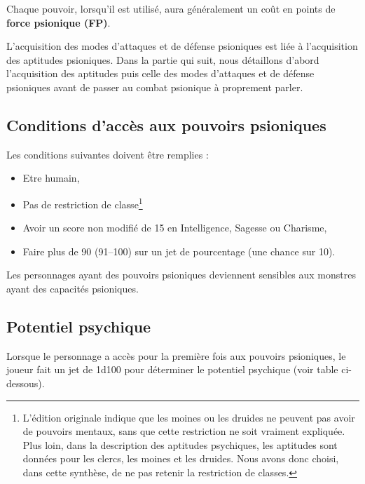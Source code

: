 \documentclass[11pt]{article}
\begin{document}
{\bigskip

Chaque pouvoir, lorsqu'il est utilisé, aura généralement un coût en points de \textbf{force psionique (FP)}.

L'acquisition des modes d'attaques et de défense psioniques est liée à l'acquisition des aptitudes psioniques. Dans la partie qui suit, nous détaillons d'abord l'acquisition des aptitudes puis celle des modes d'attaques et de défense psioniques avant de passer au combat psionique à proprement parler.

\subsection*{Conditions d'accès aux pouvoirs psioniques}

Les conditions suivantes doivent être remplies :

\bigskip

\begin{itemize}
\item Etre humain,
\item Pas de restriction de classe\footnote{L'édition originale indique que les moines ou les druides ne peuvent pas avoir de pouvoirs mentaux, sans que cette restriction ne soit vraiment expliquée. Plus loin, dans la description des aptitudes psychiques, les aptitudes sont données pour les clercs, les moines et les druides. Nous avons donc choisi, dans cette synthèse, de ne pas retenir la restriction de classes.}
\item Avoir un score non modifié de 15 en Intelligence, Sagesse ou Charisme,
\item Faire plus de 90 (91--100) sur un jet de pourcentage (une chance sur 10).
\end{itemize}

\bigskip

Les personnages ayant des pouvoirs psioniques deviennent sensibles aux monstres ayant des capacités psioniques.

\subsection*{Potentiel psychique}

Lorsque le personnage a accès pour la première fois aux pouvoirs psioniques, le joueur fait un jet de 1d100 pour déterminer le potentiel psychique (voir table ci-dessous).
\bigskip

}
\end{document}
